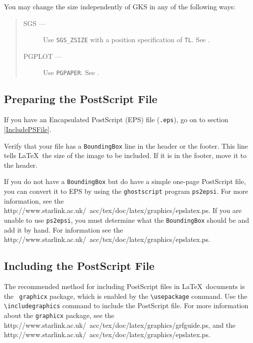 \documentclass[11pt,twoside,nolof]{starlink}
\begin{document}
You may change the size independently of GKS in any of the following ways:

\begin{quote}
  \begin{description}
    \item[SGS ---] Use \texttt{SGS\_ZSIZE} with a position specification of \texttt{TL}.
               See \cite{sun85}.
    \item[PGPLOT ---] Use \texttt{PGPAPER}. See \cite{sun15}.
  \end{description}
\end{quote}

\subsection{\label{preparing_the_postscript_file}Preparing the PostScript File}

If you have an Encapsulated PostScript (EPS) file (\texttt{.eps}),
go on to section \ref{IncludePSFile}.

    Verify that your file has a \texttt{BoundingBox} line in
    the header or the footer.
    This line tells \LaTeX\ the size of the image to be included.
    If it is in the footer, move it to the header.

    If you do not have a \texttt{BoundingBox} but
    do have a simple one-page PostScript file,
    you can convert it to EPS by using
    the \texttt{ghostscript} program \texttt{ps2epsi}.
    For more information, see the
    {http://www.starlink.ac.uk/~acc/tex/doc/latex/graphics/epslatex.ps}\cite[section 3.1, p 7]{eps}.
    If you are unable to use \texttt{ps2epsi}, you must determine what the
    \texttt{BoundingBox}  should be and add it by hand. For information see the
    {http://www.starlink.ac.uk/~acc/tex/doc/latex/graphics/epslatex.ps}\cite[section 3.1, \#2, p 8]{eps}.

\subsection{\label{includepsfile}Including the PostScript File
\label{IncludePSFile}}

The recommended method for including PostScript files in \LaTeX\
documents is the \LaTeXe\ \texttt{graphicx} package, which
is enabled by the \verb+\usepackage+ command.
Use the \verb+\includegraphics+ command to include the PostScript file.
For more information about the \texttt{graphicx} package, see the
\htmladdnormallink{graphics manual}
{http://www.starlink.ac.uk/~acc/tex/doc/latex/graphics/grfguide.ps}\cite[section 4, pp 6-14]{graphics},
and the
{http://www.starlink.ac.uk/~acc/tex/doc/latex/graphics/epslatex.ps}\cite[part I, section 1,  p 5]{eps}.
\end{document}

